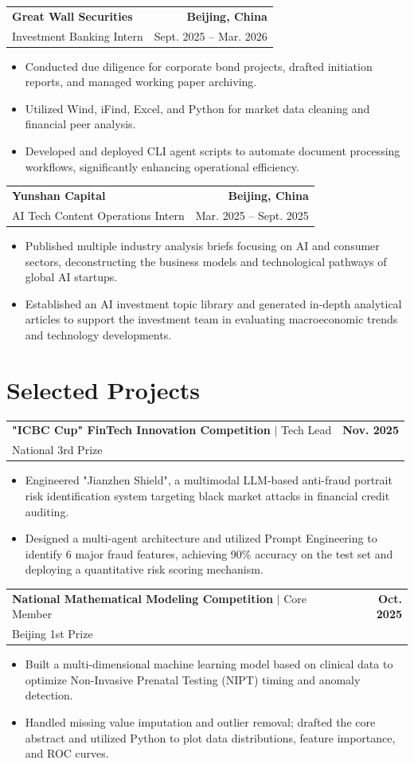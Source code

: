 \documentclass[11pt,a4paper]{article}
\makeatletter
\newcommand{\resumeSubheading}[4]{
  \vspace{3pt}
  \begin{tabular*}{1.0\textwidth}[t]{l@{\extracolsep{\fill}}r}
    \textbf{#1} & \textbf{#2} \\
    {#3} & {#4} \\
  \end{tabular*}\vspace{-4pt}
}
\newcommand{\resumeProjectHeading}[4]{
  \vspace{3pt}
  \begin{tabular*}{1.0\textwidth}[t]{l@{\extracolsep{\fill}}r}
    \textbf{#1} $|$ {#2} & \textbf{#3} \\
    {#4} & \\
  \end{tabular*}\vspace{-4pt}
}
\makeatother
\begin{document}
\resumeSubheading
  {Great Wall Securities}{Beijing, China}
  {Investment Banking Intern}{Sept. 2025 -- Mar. 2026}
\begin{itemize}
  \item Conducted due diligence for corporate bond projects, drafted initiation reports, and managed working paper archiving.
  \item Utilized Wind, iFind, Excel, and Python for market data cleaning and financial peer analysis.
  \item Developed and deployed CLI agent scripts to automate document processing workflows, significantly enhancing operational efficiency.
\end{itemize}

\resumeSubheading
  {Yunshan Capital}{Beijing, China}
  {AI Tech Content Operations Intern}{Mar. 2025 -- Sept. 2025}
\begin{itemize}
  \item Published multiple industry analysis briefs focusing on AI and consumer sectors, deconstructing the business models and technological pathways of global AI startups.
  \item Established an AI investment topic library and generated in-depth analytical articles to support the investment team in evaluating macroeconomic trends and technology developments.
\end{itemize}

\section{Selected Projects}
\resumeProjectHeading
  {"ICBC Cup" FinTech Innovation Competition}{Tech Lead}{Nov. 2025}{National 3rd Prize}
\begin{itemize}
  \item Engineered "Jianzhen Shield", a multimodal LLM-based anti-fraud portrait risk identification system targeting black market attacks in financial credit auditing.
  \item Designed a multi-agent architecture and utilized Prompt Engineering to identify 6 major fraud features, achieving 90\% accuracy on the test set and deploying a quantitative risk scoring mechanism.
\end{itemize}

\resumeProjectHeading
  {National Mathematical Modeling Competition}{Core Member}{Oct. 2025}{Beijing 1st Prize}
\begin{itemize}
  \item Built a multi-dimensional machine learning model based on clinical data to optimize Non-Invasive Prenatal Testing (NIPT) timing and anomaly detection.
  \item Handled missing value imputation and outlier removal; drafted the core abstract and utilized Python to plot data distributions, feature importance, and ROC curves.
\end{itemize}


\end{document}
